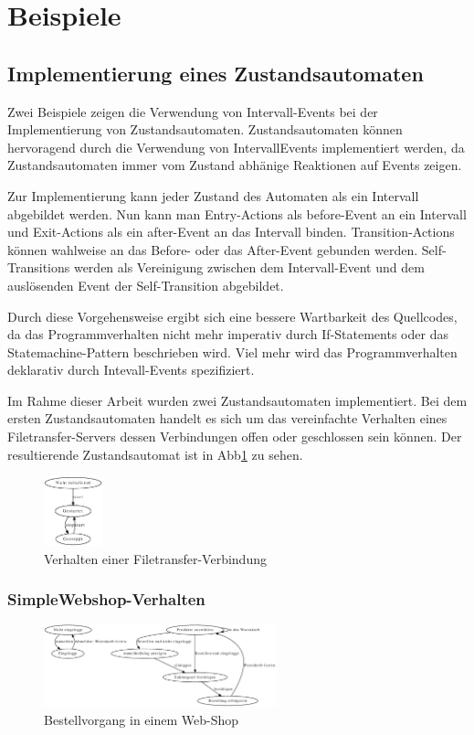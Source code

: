 \section{Beispiele}
\subsection{Implementierung eines Zustandsautomaten}
Zwei Beispiele zeigen die Verwendung von Intervall-Events bei der
Implementierung von Zustandsautomaten. Zustandsautomaten können hervoragend
durch die Verwendung von IntervallEvents implementiert werden, da
Zustandsautomaten immer vom Zustand abhänige Reaktionen auf Events zeigen.

Zur Implementierung kann jeder Zustand des Automaten als ein Intervall
abgebildet werden. Nun kann man Entry-Actions als before-Event an ein Intervall
und Exit-Actions als ein after-Event an das Intervall binden. Transition-Actions
können wahlweise an das Before- oder das After-Event gebunden werden.
Self-Transitions werden als Vereinigung zwischen dem Intervall-Event und dem
auslösenden Event der Self-Transition abgebildet. 

Durch diese Vorgehensweise ergibt sich eine bessere Wartbarkeit des
Quellcodes, da das Programmverhalten nicht mehr imperativ durch If-Statements
oder das Statemachine-Pattern beschrieben wird. Viel mehr wird das
Programmverhalten deklarativ durch Intevall-Events spezifiziert.

Im Rahme dieser Arbeit wurden zwei Zustandsautomaten implementiert. Bei dem
ersten Zustandsautomaten handelt es sich um das vereinfachte Verhalten eines
Filetransfer-Servers dessen Verbindungen offen oder geschlossen sein können. Der
resultierende Zustandsautomat ist in Abb\ref{filetransfer_behaviour} zu sehen.

\begin{figure}[htp]
\begin{center}
  \includegraphics[width=0.15\textwidth]{./graphics/tcp_stm.dot.eps}
  \caption{Verhalten einer Filetransfer-Verbindung}
  \label{filetransfer_behaviour}
\end{center}
\end{figure}

\subsubsection{SimpleWebshop-Verhalten}

\begin{figure}[htp]
\begin{center}
  \includegraphics[width=0.6\textwidth]{./graphics/webshop.dot.eps}
  \caption{Bestellvorgang in einem Web-Shop}
  \label{webshop_behaviour}
\end{center}
\end{figure}